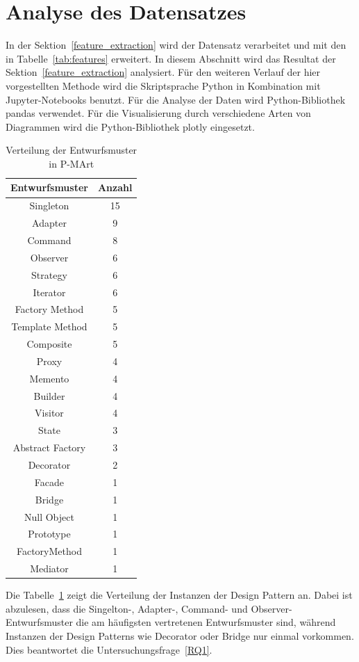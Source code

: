 \section{Analyse des Datensatzes}\label{dataset_analysis}

In der Sektion~\ref{feature_extraction} wird der Datensatz verarbeitet und mit den in Tabelle~\ref{tab:features} erweitert.
In diesem Abschnitt wird das Resultat der Sektion~\ref{feature_extraction} analysiert.
Für den weiteren Verlauf der hier vorgestellten Methode wird die Skriptsprache Python in Kombination mit Jupyter-Notebooks benutzt. Für die Analyse der Daten wird Python-Bibliothek pandas verwendet. Für die Visualisierung durch verschiedene Arten von Diagrammen wird die Python-Bibliothek plotly eingesetzt.


\begin{table}[h]
    \begin{tabular}{|c|c|}
        \hline
        Entwurfsmuster & Anzahl\\
        \hline
        Singleton&15\\Adapter&9\\Command&8\\Observer&6\\Strategy&6\\Iterator&6\\Factory Method&5\\Template Method&5\\Composite&5\\Proxy&4\\Memento&4\\Builder&4\\Visitor&4\\State&3\\Abstract Factory&3\\Decorator&2\\Facade&1\\Bridge&1\\Null Object&1\\Prototype&1\\FactoryMethod&1\\Mediator&1\\
        \hline
    \end{tabular}
    \caption{Verteilung der Entwurfsmuster in P-MArt}
    \label{tab:dp_dist}
\end{table}



Die Tabelle~\ref{tab:dp_dist} zeigt die Verteilung der Instanzen der Design Pattern an. 
Dabei ist abzulesen, dass die Singelton-, Adapter-, Command- und Observer-Entwurfsmuster die am häufigsten vertretenen Entwurfsmuster sind, während Instanzen der Design Patterns wie Decorator oder Bridge nur einmal vorkommen.
Dies beantwortet die Untersuchungsfrage~\ref{RQ1}.

